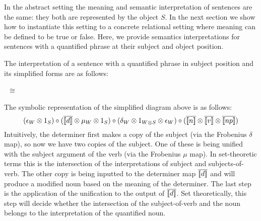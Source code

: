 %
%




In the  abstract setting the meaning and semantic interpretation of sentences are the same: they both are represented by the object $S$.  In the next section we show how to instantiate this setting to a concrete relational setting where meaning can be defined to be true or false.  Here, we provide semantics  interpretations for sentences with a quantified phrase at their subject and object position.  

The interpretation of a  sentence with a  quantified phrase in  subject position  and its simplified forms are as follows:


\begin{minipage}{20cm}
\begin{minipage}{7cm}
\end{minipage}
\ $\cong$ \ \qquad
\begin{minipage}{5cm}
\end{minipage}
\end{minipage}


\noindent
The symbolic representation of the simplified   diagram above is as follows:
\[
(\epsilon_W \otimes 1_S) \circ (\overline{\semantics{d}} \otimes  \mu_W \otimes 1_S) \circ (\delta_W \otimes 1_{W \otimes S} \otimes \epsilon_W)  \circ (\overline{\semantics{n}} \otimes \overline{\semantics{v}} \otimes \overline{\semantics{np}})
\]
Intuitively,   the determiner first makes a copy of the subject (via the Frobenius $\delta$ map), so now we have two copies of the subject. One of these is being unified with the subject argument of the verb (via the Frobenius $\mu$ map). In set-theoretic terms this is the intersection of the interpretations of subject and subjects-of-verb. The other copy is being inputted to the determiner map $\overline{[\![ d ]\!]}$ and will produce a modified noun based on the meaning of the determiner.  The last step is the application of the unification to the output of $\overline{[\![ d ]\!]}$. Set theoretically, this step will decide whether the intersection of the subject-of-verb and the noun belongs to the interpretation of the quantified noun. 



